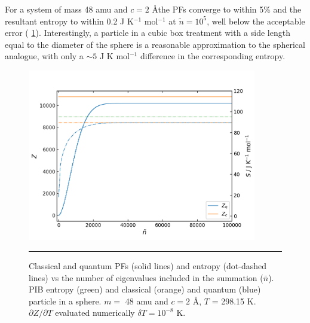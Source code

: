 \documentclass[../main.tex]{subfiles}
\begin{document}
For a system of mass 48 amu and $c = 2$ \AA the PFs converge to within 5\% and the resultant entropy to within 0.2 J K$^{-1}$ mol$^{-1}$ at $\tilde{n} = 10^5$, well below the acceptable error (\figurename{ \ref{spherical_well_z_s_qunat_classical}}). Interestingly, a particle in a cubic box treatment with a side length equal to the diameter of the sphere is a reasonable approximation to the spherical analogue, with only a $\sim 5$ J K mol$^{-1}$ difference in the corresponding entropy.

\begin{figure}[h!]
	\centering
	\includegraphics[height=7.5cm]{4/figs/spherical_well_z_s_qunat_classical}
	\vspace{0.2cm}
	\hrule
	\caption{Classical and quantum PFs (solid lines) and entropy (dot-dashed lines) vs the number of eigenvalues included in the summation ($\bar{n}$). PIB entropy (green) and classical (orange) and quantum (blue) particle in a sphere. $m =$ 48 amu and $c = 2$ \AA, $T$ = 298.15 K. $\partial Z / \partial T$ evaluated numerically $\delta T = 10^{-8}$ K.} 
	\label{spherical_well_z_s_qunat_classical}
\end{figure}
\end{document}
